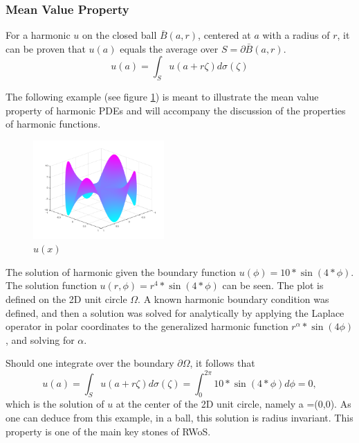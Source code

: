 
  \subsubsection{Mean Value Property}\label{sssec:meanvalue}
  For a harmonic $u$ on the closed ball $\bar{B}(a,r)$, centered at $a$ with a radius of $r$,
  it can be proven that $u(a)$ equals the average over $S = \partial \bar{B}(a,r)$\cite{Axler1992,Bornemann}.
\begin{equation}
  \tag{Mean Value Property}
  u(a) = \int_{S} u(a + r\zeta)d\sigma(\zeta)
  \label{eq:mean}
\end{equation}

The following example (see figure \ref{fig:swingPlot}) is meant to illustrate
the mean value property of harmonic \Glspl{PDE} and will accompany the discussion
of the properties of harmonic functions.

\begin{figure}[ht]
  \centering
  \includegraphics[width=5cm]{styles/swing_function_plot.png}
  \caption{$u(x)$}%
  \label{fig:swingPlot}
\end{figure}

 The solution of harmonic  given the boundary
function $u(\phi)=10*\sin(4*\phi)$. The solution function $u(r,\phi)=r^{4}*\sin(4*\phi)$
can be seen. The plot is defined on the 2D unit circle $\Omega$.  A known harmonic boundary
condition was defined, and then a solution was solved for analytically by applying the Laplace operator
in polar coordinates to the generalized harmonic function $r^{\alpha}*\sin(4\phi)$,
and solving for $\alpha$.

Should one integrate over the boundary $\partial \Omega$, it follows that \begin{equation}
u(a) = \int_{S}u(a + r\zeta)d\sigma(\zeta) = \int_{0}^{2\pi} 10*\sin(4*\phi)d\phi = 0,
\label{eq:radinvar}
\end{equation}
which is the solution of $u$ at the center of the 2D unit circle,
namely a =(0,0). As one can deduce from this example, in a ball, this solution is
radius invariant.  This property is one of the main key stones of \Gls{RWoS}. \label{radiusInvariance}
